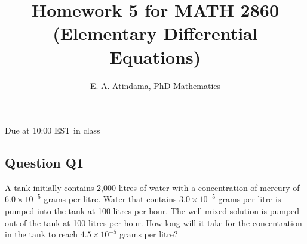 \documentclass[a4paper,11pt,reqno]{amsart}
\title[MATH 2860 (Elementary Differential Equations)]{Homework 5 for MATH 2860 (Elementary Differential Equations)}
\author[Emmanuel Atindama]{E. A. Atindama, PhD Mathematics}
\numberwithin{equation}{section}
\begin{document}
\maketitle

Due at 10:00 EST in class

\subsection*{Question Q1}
  A tank initially contains 2,000 litres of water with a concentration of mercury of $6.0\times10^{-5}$ grams
  per litre. Water that contains $3.0\times 10^{-5}$ grams per litre is pumped into the tank at 100 litres per
  hour. The well mixed solution is pumped out of the tank at 100 litres per hour. How long will it
  take for the concentration in the tank to reach $4.5\times 10^{-5}$ grams per litre?
\end{document}
